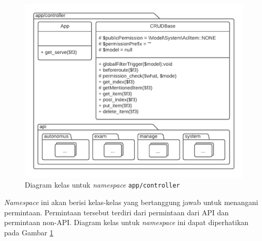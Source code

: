     \begin{figure}
        \centering
        \includegraphics{Gambar/classmap-be/Classmap - app-controller.pdf}
        \caption{Diagram kelas untuk \textit{namespace} \texttt{app/controller}}
        \label{fig:classmap_app-controller}
    \end{figure}

    \textit{Namespace} ini akan berisi kelas-kelas yang bertanggung jawab untuk
    menangani permintaan. Permintaan tersebut terdiri dari permintaan dari API dan permintaan
    non-API. Diagram kelas untuk \textit{namespace} ini dapat diperhatikan pada Gambar
    \ref{fig:classmap_app-controller}
    
